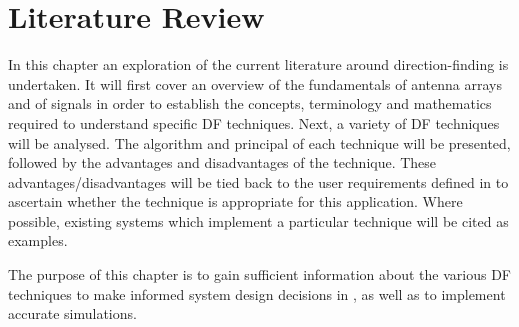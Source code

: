 \chapter{Literature Review}
\label{ch:lit-review}
In this chapter an exploration of the current literature around direction-finding is undertaken.
It will first cover an overview of the fundamentals of antenna arrays and of signals in order to establish the concepts, terminology and mathematics required to understand specific DF techniques. 
Next, a variety of DF techniques will be analysed. The algorithm and principal of each technique will be presented, followed by the advantages and disadvantages of the technique. 
These advantages/disadvantages will be tied back to the user requirements defined in  to ascertain whether the technique is appropriate for this application. Where possible, existing systems which implement a particular technique will be cited as examples.

The purpose of this chapter is to gain sufficient information about the various DF techniques to make informed system design decisions in , as well as to implement accurate simulations.




